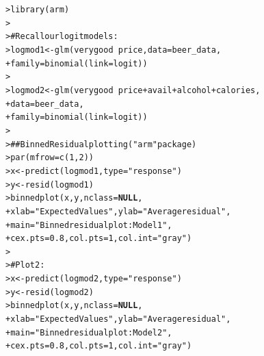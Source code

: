 \documentclass[12pt]{article}\usepackage[]{graphicx}\usepackage[]{color}
\makeatletter
\newcommand{\hlnum}[1]{\textcolor[rgb]{0.82,0.78,0.62}{#1}}%
\newcommand{\hlstr}[1]{\textcolor[rgb]{0.82,0.78,0.62}{#1}}%
\newcommand{\hlcom}[1]{\textcolor[rgb]{0.404,0.408,0.42}{#1}}%
\newcommand{\hlopt}[1]{\textcolor[rgb]{0.882,0.878,0.898}{#1}}%
\newcommand{\hlstd}[1]{\textcolor[rgb]{0.882,0.878,0.898}{#1}}%
\newcommand{\hlkwa}[1]{\textcolor[rgb]{0.384,0.675,0.808}{\textbf{#1}}}%
\newcommand{\hlkwb}[1]{\textcolor[rgb]{0.902,0.675,0.196}{#1}}%
\newcommand{\hlkwc}[1]{\textcolor[rgb]{0.812,0.522,0.388}{#1}}%
\newcommand{\hlkwd}[1]{\textcolor[rgb]{0.733,0.388,0.812}{#1}}%
\newenvironment{kframe}{%
 \def\at@end@of@kframe{}%
 \ifinner\ifhmode%
  \def\at@end@of@kframe{\end{minipage}}%
  \begin{minipage}{\columnwidth}%
 \fi\fi%
 \def\FrameCommand##1{\hskip\@totalleftmargin \hskip-\fboxsep
 \colorbox{shadecolor}{##1}\hskip-\fboxsep
     \hskip-\linewidth \hskip-\@totalleftmargin \hskip\columnwidth}%
 \MakeFramed {\advance\hsize-\width
   \@totalleftmargin\z@ \linewidth\hsize
   \@setminipage}}%
 {\par\unskip\endMakeFramed%
 \at@end@of@kframe}
\newenvironment{knitrout}{}{} %
\makeatother
\begin{document}
\begin{flushleft}
\begin{center}
\begin{knitrout}
\color{fgcolor}\begin{kframe}
\begin{alltt}
\hlstd{> }\hlkwd{library}\hlstd{(arm)}
\hlstd{> }
\hlstd{> }\hlcom{# Recall our logit models:}
\hlstd{> }\hlstd{logmod1} \hlkwb{<-} \hlkwd{glm}\hlstd{(verygood} \hlopt{~} \hlstd{price,} \hlkwc{data} \hlstd{= beer_data,}
\hlstd{+ }               \hlkwc{family} \hlstd{=} \hlkwd{binomial}\hlstd{(}\hlkwc{link}\hlstd{=logit))}
\hlstd{> }
\hlstd{> }\hlstd{logmod2} \hlkwb{<-} \hlkwd{glm}\hlstd{(verygood} \hlopt{~} \hlstd{price} \hlopt{+} \hlstd{avail} \hlopt{+} \hlstd{alcohol} \hlopt{+} \hlstd{calories,}
\hlstd{+ }               \hlkwc{data} \hlstd{= beer_data,}
\hlstd{+ }               \hlkwc{family} \hlstd{=} \hlkwd{binomial}\hlstd{(}\hlkwc{link}\hlstd{=logit))}
\hlstd{> }
\hlstd{> }\hlcom{## Binned Residual plotting ("arm" package)}
\hlstd{> }\hlkwd{par}\hlstd{(}\hlkwc{mfrow}\hlstd{=}\hlkwd{c}\hlstd{(}\hlnum{1}\hlstd{,}\hlnum{2}\hlstd{))}
\hlstd{> }\hlstd{x} \hlkwb{<-} \hlkwd{predict}\hlstd{(logmod1,} \hlkwc{type} \hlstd{=} \hlstr{"response"}\hlstd{)}
\hlstd{> }\hlstd{y} \hlkwb{<-} \hlkwd{resid}\hlstd{(logmod1)}
\hlstd{> }\hlkwd{binnedplot}\hlstd{(x, y,} \hlkwc{nclass}\hlstd{=}\hlkwa{NULL}\hlstd{,}
\hlstd{+ }           \hlkwc{xlab}\hlstd{=}\hlstr{"Expected Values"}\hlstd{,} \hlkwc{ylab}\hlstd{=}\hlstr{"Average residual"}\hlstd{,}
\hlstd{+ }           \hlkwc{main}\hlstd{=}\hlstr{"Binned residual plot: Model 1"}\hlstd{,}
\hlstd{+ }           \hlkwc{cex.pts}\hlstd{=}\hlnum{0.8}\hlstd{,} \hlkwc{col.pts}\hlstd{=}\hlnum{1}\hlstd{,} \hlkwc{col.int}\hlstd{=}\hlstr{"gray"}\hlstd{)}
\hlstd{> }
\hlstd{> }\hlcom{# Plot 2:}
\hlstd{> }\hlstd{x} \hlkwb{<-} \hlkwd{predict}\hlstd{(logmod2,} \hlkwc{type} \hlstd{=} \hlstr{"response"}\hlstd{)}
\hlstd{> }\hlstd{y} \hlkwb{<-} \hlkwd{resid}\hlstd{(logmod2)}
\hlstd{> }\hlkwd{binnedplot}\hlstd{(x, y,} \hlkwc{nclass}\hlstd{=}\hlkwa{NULL}\hlstd{,}
\hlstd{+ }           \hlkwc{xlab}\hlstd{=}\hlstr{"Expected Values"}\hlstd{,} \hlkwc{ylab}\hlstd{=}\hlstr{"Average residual"}\hlstd{,}
\hlstd{+ }           \hlkwc{main}\hlstd{=}\hlstr{"Binned residual plot: Model 2"}\hlstd{,}
\hlstd{+ }           \hlkwc{cex.pts}\hlstd{=}\hlnum{0.8}\hlstd{,} \hlkwc{col.pts}\hlstd{=}\hlnum{1}\hlstd{,} \hlkwc{col.int}\hlstd{=}\hlstr{"gray"}\hlstd{)}
\end{alltt}
\end{kframe}

\end{knitrout}
\end{center}
\end{flushleft}
\end{document}
